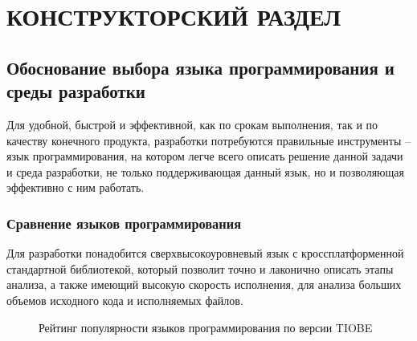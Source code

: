 \chapter{КОНСТРУКТОРСКИЙ РАЗДЕЛ}\label{ch:ch2}
\section{Обоснование выбора языка программирования и среды разработки}\label{sec:ch2/sec1}
Для удобной, быстрой и эффективной, как по срокам выполнения, так и по качеству конечного продукта,
разработки {\ProgModule} потребуются правильные инструменты -- язык программирования, на котором 
легче всего описать решение данной задачи и среда разработки, не только поддерживающая данный язык,
но и позволяющая эффективно с ним работать.

\subsection{Сравнение языков программирования}\label{sec:ch2/sec1/sub1}
Для разработки {\ProgModule} понадобится сверхвысокоуровневый язык с кроссплатформенной
стандартной библиотекой, который позволит точно и лаконично описать этапы анализа,
а также имеющий высокую скорость исполнения, для анализа больших объемов исходного кода и
исполняемых файлов.
\begin{figure}[!htbp]
    \caption{Рейтинг популярности языков программирования по версии TIOBE\label{fig:lang-ratings}}
\end{figure}

